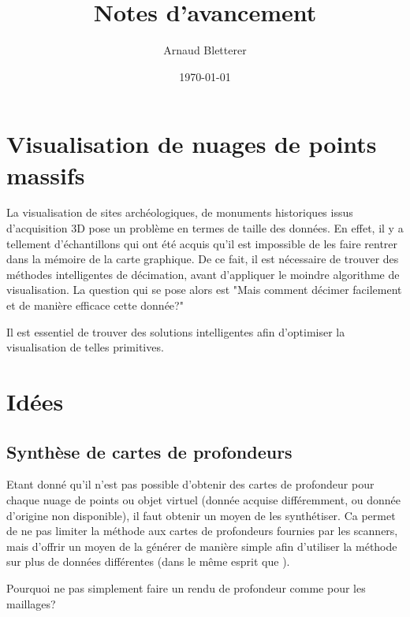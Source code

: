 \documentclass{report}
\title{Notes d'avancement}
\author{Arnaud Bletterer}
\date{\today}
\begin{document}
\maketitle

\chapter{Visualisation de nuages de points massifs}

La visualisation de sites archéologiques, de monuments historiques issus d'acquisition 3D pose un problème en termes de taille des données.
En effet, il y a tellement d'échantillons qui ont été acquis qu'il est impossible de les faire rentrer dans la mémoire de la carte graphique.
De ce fait, il est nécessaire de trouver des méthodes intelligentes de décimation, avant d'appliquer le moindre algorithme de visualisation.
La question qui se pose alors est "Mais comment décimer facilement et de manière efficace cette donnée?"

Il est essentiel de trouver des solutions intelligentes afin d'optimiser la visualisation de telles primitives.

\chapter{Idées} %
\label{cha:idees}

\section{Synthèse de cartes de profondeurs}

Etant donné qu'il n'est pas possible d'obtenir des cartes de profondeur pour chaque nuage de points ou objet virtuel (donnée acquise différemment, ou donnée d'origine non disponible), il faut obtenir un moyen de les synthétiser.
Ca permet de ne pas limiter la méthode aux cartes de profondeurs fournies par les scanners, mais d'offrir un moyen de la générer de manière simple afin d'utiliser la méthode sur plus de données différentes (dans le même esprit que \cite{Sor11}).

Pourquoi ne pas simplement faire un rendu de profondeur comme pour les maillages?
\end{document}
